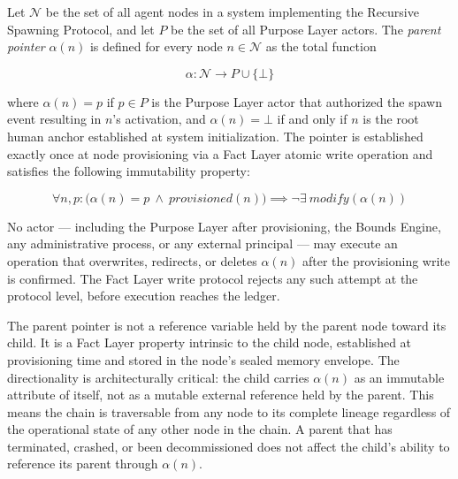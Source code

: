 \begin{dfn}
\label{dfn:parent-pointer}
Let $\mathcal{N}$ be the set of all agent nodes in a \bxthree{} system implementing the Recursive Spawning Protocol, and let $P$ be the set of all Purpose Layer actors. The \emph{parent pointer} $\alpha(n)$ is defined for every node $n \in \mathcal{N}$ as the total function

\begin{equation}
\alpha : \mathcal{N} \rightarrow P \cup \{\bot\}
\label{eq:alpha-function}
\end{equation}

where $\alpha(n) = p$ if $p \in P$ is the Purpose Layer actor that authorized the spawn event resulting in $n$'s activation, and $\alpha(n) = \bot$ if and only if $n$ is the root human anchor established at system initialization. The pointer is established exactly once at node provisioning via a Fact Layer atomic write operation and satisfies the following immutability property:

\begin{equation}
\forall n, p : \bigl(\alpha(n) = p \ \land \ \textit{provisioned}(n)\bigr) \implies \neg\exists\ \textit{modify}(\alpha(n))
\label{eq:parent-pointer-immutable}
\end{equation}

No actor — including the Purpose Layer after provisioning, the Bounds Engine, any administrative process, or any external principal — may execute an operation that overwrites, redirects, or deletes $\alpha(n)$ after the provisioning write is confirmed. The Fact Layer write protocol rejects any such attempt at the protocol level, before execution reaches the ledger.
\end{dfn}

The parent pointer is not a reference variable held by the parent node toward its child. It is a Fact Layer property intrinsic to the child node, established at provisioning time and stored in the node's sealed memory envelope. The directionality is architecturally critical: the child carries $\alpha(n)$ as an immutable attribute of itself, not as a mutable external reference held by the parent. This means the chain is traversable from any node to its complete lineage regardless of the operational state of any other node in the chain. A parent that has terminated, crashed, or been decommissioned does not affect the child's ability to reference its parent through $\alpha(n)$.

